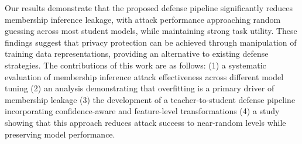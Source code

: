 \documentclass[conference]{IEEEtran}
\begin{document}
Our results demonstrate that the proposed defense pipeline significantly reduces membership inference leakage, with attack performance approaching random guessing across most student models, while maintaining strong task utility. These findings suggest that privacy protection can be achieved through manipulation of training data representations, providing an alternative to existing defense strategies.
The contributions of this work are as follows:
(1) a systematic evaluation of membership inference attack effectiveness across different model tuning
(2) an analysis demonstrating that overfitting is a primary driver of membership leakage
(3) the development of a teacher-to-student defense pipeline incorporating confidence-aware and feature-level transformations
(4) a study showing that this approach reduces attack success to near-random levels while preserving model performance.
\end{document}
